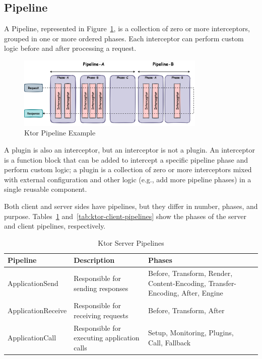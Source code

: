 \subsection{Pipeline}\label{subsec:pipeline}

A Pipeline, represented in Figure~\ref{fig:ktor-pipeline}, is a collection of zero or more interceptors, grouped in one or more ordered phases.
Each interceptor can perform custom logic before and after processing a request.

\begin{figure}[!htb]
    \centering
    \includegraphics[width=0.8\textwidth]{../figures/03_ktor-pipeline}
    \caption{Ktor Pipeline Example}
    \label{fig:ktor-pipeline}
\end{figure}

A plugin is also an interceptor, but an interceptor is not a plugin.
An interceptor is a function block that can be added to intercept a specific pipeline phase and perform custom logic;
a plugin is a collection of zero or more interceptors mixed with external configuration and other logic
(e.g., add more pipeline phases) in a single reusable component.

Both client and server sides have pipelines, but they differ in number, phases, and purpose.
Tables~\ref{tab:ktor-server-pipelines} and~\ref{tab:ktor-client-pipelines} show the phases of the server and client pipelines, respectively.

\begin{table}[!htb]
    \centering
    \caption{Ktor Server Pipelines}
    \label{tab:ktor-server-pipelines}
    \vspace{0.3cm}
    \begin{tabular}{|l|p{6cm}|p{5cm}|p{5cm}|}
        \hline
        \textbf{Pipeline}  & \textbf{Description}                        & \textbf{Phases}                                                               \\ \hline
        ApplicationSend    & Responsible for sending responses           & Before, Transform, Render, Content-Encoding, Transfer-Encoding, After, Engine \\ \hline
        ApplicationReceive & Responsible for receiving requests          & Before, Transform, After                                                      \\ \hline
        ApplicationCall    & Responsible for executing application calls & Setup, Monitoring, Plugins, Call, Fallback                                    \\ \hline
    \end{tabular}
\end{table}

